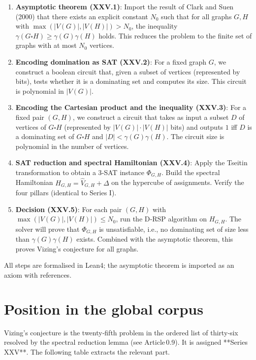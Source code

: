 \documentclass[11pt,a4paper]{article}
\begin{document}
\begin{enumerate}
\item \textbf{Asymptotic theorem (XXV.1)}: Import the result of Clark and Suen (2000) that there exists an explicit constant $N_0$ such that for all graphs $G,H$ with $\max(|V(G)|,|V(H)|) > N_0$, the inequality $\gamma(G\square H) \ge \gamma(G)\gamma(H)$ holds. This reduces the problem to the finite set of graphs with at most $N_0$ vertices.
\item \textbf{Encoding domination as SAT (XXV.2)}: For a fixed graph $G$, we construct a boolean circuit that, given a subset of vertices (represented by bits), tests whether it is a dominating set and computes its size. This circuit is polynomial in $|V(G)|$.
\item \textbf{Encoding the Cartesian product and the inequality (XXV.3)}: For a fixed pair $(G,H)$, we construct a circuit that takes as input a subset $D$ of vertices of $G\square H$ (represented by $|V(G)|\cdot|V(H)|$ bits) and outputs $1$ iff $D$ is a dominating set of $G\square H$ and $|D| < \gamma(G)\gamma(H)$. The circuit size is polynomial in the number of vertices.
\item \textbf{SAT reduction and spectral Hamiltonian (XXV.4)}: Apply the Tseitin transformation to obtain a 3‑SAT instance $\Phi_{G,H}$. Build the spectral Hamiltonian $H_{G,H} = \hat{V}_{G,H} + \Delta$ on the hypercube of assignments. Verify the four pillars (identical to Series I).
\item \textbf{Decision (XXV.5)}: For each pair $(G,H)$ with $\max(|V(G)|,|V(H)|) \le N_0$, run the D‑RSP algorithm on $H_{G,H}$. The solver will prove that $\Phi_{G,H}$ is unsatisfiable, i.e., no dominating set of size less than $\gamma(G)\gamma(H)$ exists. Combined with the asymptotic theorem, this proves Vizing's conjecture for all graphs.
\end{enumerate}

All steps are formalised in Lean4; the asymptotic theorem is imported as an axiom with references.

\section{Position in the global corpus}

Vizing's conjecture is the twenty‑fifth problem in the ordered list of thirty‑six resolved by the spectral reduction lemma (see Article 0.9). It is assigned **Series XXV**. The following table extracts the relevant part.
\end{document}
